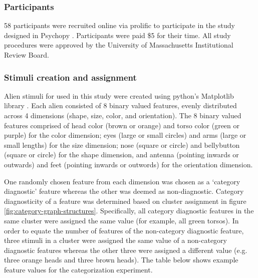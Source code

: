\subsubsection*{Participants}
58 participants were recruited online via prolific to participate in the study designed in Psychopy \cite{peirce2007psychopy}. Participants were paid \$5 for their time. All study procedures were approved by the University of Massachusetts Institutional Review Board. 

\subsubsection*{Stimuli creation and assignment}
Alien stimuli for used in this study were created using python's Matplotlib library \cite{hunter2007matplotlib}. Each alien consisted of 8 binary valued features, evenly distributed across 4 dimensions (shape, size, color, and orientation). The 8 binary valued features comprised of head color (brown or orange) and torso color (green or purple) for the color dimension; eyes (large or small circles) and arms (large or small lengths) for the size dimension; nose (square or circle) and bellybutton (square or circle) for the shape dimension, and antenna (pointing inwards or outwards) and feet (pointing inwards or outwords) for the orientation dimension. 

One randomly chosen feature from each dimension was chosen as a `category diagnostic' feature whereas the other was deemed as non-diagnostic. Category diagnosticity of a feature was determined based on cluster assignment in figure \ref{fig:category-graph-structures}. Specifically, all category diagnostic features in the same cluster were assigned the same value (for example, all green torsos). In order to equate the number of features of the non-category diagnostic feature, three stimuli in a cluster were assigned the same value of a non-category diagnostic features whereas the other three were assigned a different value (e.g. three orange heads and three brown heads). The table below shows example feature values for the categorization experiment. 

